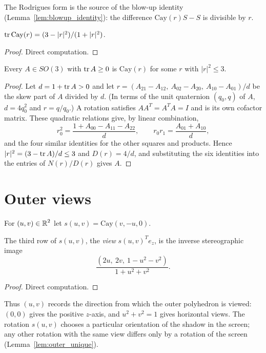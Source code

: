 The Rodrigues form is the source of the blow-up identity
(Lemma~\ref{lem:blowup_identity}): the difference $\mathrm{Cay}(r) S - S$ is divisible
by $r$.

\begin{lemma}
\label{lem:cayley_trace}
\leanok
{}
$\operatorname{\mathrm{tr}} \mathrm{Cay}(r) = (3 - |r|^2) / (1 + |r|^2)$.
\end{lemma}
\begin{proof}
\leanok
Direct computation.
\end{proof}

\begin{theorem}
\label{thm:cayley_surj}
\leanok
{}
Every $A \in SO(3)$ with $\operatorname{\mathrm{tr}} A \ge 0$ is $\mathrm{Cay}(r)$ for some $r$ with
$|r|^2 \le 3$.
\end{theorem}
\begin{proof}
\leanok
Let $d = 1 + \operatorname{\mathrm{tr}} A > 0$ and let $r = (A_{21} - A_{12},\ A_{02} - A_{20},\ A_{10} - A_{01}) / d$
be the skew part of $A$ divided by $d$. (In terms of the unit quaternion $(q_0, q)$ of $A$,
$d = 4 q_0^2$ and $r = q / q_0$.) A rotation satisfies $A A^T = A^T A = I$ and is its own
cofactor matrix. These quadratic relations give, by linear combination,
\[
  r_0^2 = \frac{1 + A_{00} - A_{11} - A_{22}}{d}, \qquad
  r_0 r_1 = \frac{A_{01} + A_{10}}{d},
\]
and the four similar identities for the other squares and products. Hence
$|r|^2 = (3 - \operatorname{\mathrm{tr}} A)/d \le 3$ and $D(r) = 4/d$, and substituting the six identities into
the entries of $N(r)/D(r)$ gives $A$.
\end{proof}

\section{Outer views}

\begin{definition}
\label{def:outer_rot}
\leanok
{}
For $(u, v) \in \operatorname{\mathbb{R}}^2$ let $s(u, v) = \mathrm{Cay}(v, -u, 0)$.
\end{definition}

\begin{lemma}
\label{lem:outer_view}
\leanok
{}
The third row of $s(u, v)$, the \emph{view} $s(u,v)^T e_z$, is the inverse
stereographic image
\[
  \frac{(2u,\ 2v,\ 1 - u^2 - v^2)}{1 + u^2 + v^2}.
\]
\end{lemma}
\begin{proof}
\leanok
Direct computation.
\end{proof}

Thus $(u,v)$ records the direction from which the outer polyhedron is viewed:
$(0,0)$ gives the positive $z$-axis, and $u^2+v^2=1$ gives horizontal views.
The rotation $s(u,v)$ chooses a particular orientation of the shadow in the screen;
any other rotation with the same view differs only by a rotation of the screen
(Lemma~\ref{lem:outer_unique}).
